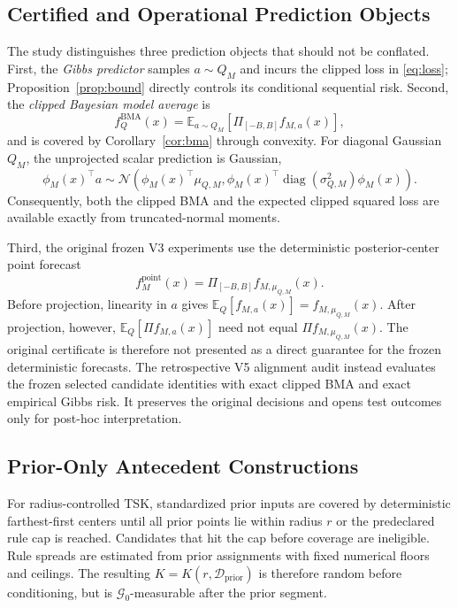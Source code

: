 \subsection{Certified and Operational Prediction Objects}
The study distinguishes three prediction objects that should not be conflated.
First, the \emph{Gibbs predictor} samples $a\sim Q_M$ and incurs the clipped
loss in \eqref{eq:loss}; Proposition~\ref{prop:bound} directly controls its
conditional sequential risk. Second, the \emph{clipped Bayesian model average}
is
\begin{equation}
 f_Q^{\mathrm{BMA}}(x)=
 \mathbb E_{a\sim Q_M}\!\left[
 \Pi_{[-B,B]}f_{M,a}(x)\right],
\label{eq:clipped_bma}
\end{equation}
and is covered by Corollary~\ref{cor:bma} through convexity. For diagonal
Gaussian $Q_M$, the unprojected scalar prediction is Gaussian,
\begin{equation}
 \phi_M(x)^\top a\sim
 \mathcal N\!\left(
 \phi_M(x)^\top\mu_{Q,M},
 \phi_M(x)^\top
 \operatorname{diag}(\sigma_{Q,M}^2)\phi_M(x)
 \right).
\label{eq:scalar_predictive_gaussian}
\end{equation}
Consequently, both the clipped BMA and the expected clipped squared loss are
available exactly from truncated-normal moments.

Third, the original frozen V3 experiments use the deterministic posterior-center point forecast
\begin{equation}
 f_M^{\mathrm{point}}(x)=
 \Pi_{[-B,B]}f_{M,\mu_{Q,M}}(x).
\label{eq:point_predictor}
\end{equation}
Before projection, linearity in $a$ gives
$\mathbb E_Q[f_{M,a}(x)]=f_{M,\mu_{Q,M}}(x)$. After projection, however,
$\mathbb E_Q[\Pi f_{M,a}(x)]$ need not equal
$\Pi f_{M,\mu_{Q,M}}(x)$. The original certificate is therefore not
presented as a direct guarantee for the frozen deterministic forecasts. The
retrospective V5 alignment audit instead evaluates the frozen selected
candidate identities with exact clipped BMA and exact empirical Gibbs risk.
It preserves the original decisions and opens test outcomes only for
post-hoc interpretation.

\subsection{Prior-Only Antecedent Constructions}
For radius-controlled TSK, standardized prior inputs are covered by deterministic farthest-first centers until all prior points lie within radius $r$ or the predeclared rule cap is reached. Candidates that hit the cap before coverage are ineligible. Rule spreads are estimated from prior assignments with fixed numerical floors and ceilings. The resulting $K=K(r,\mathcal D_{\mathrm{prior}})$ is therefore random before conditioning, but is $\mathcal G_0$-measurable after the prior segment.


